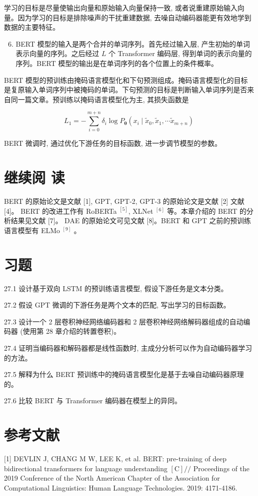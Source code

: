 \documentclass[10pt]{article}
\begin{document}
学习的目标是尽量使输出向量和原始输入向量保持一致, 或者说重建原始输入向量。因为学习的目标是排除噪声的干扰重建数据, 去噪自动编码器能更有效地学到数据的主要特征。

\begin{enumerate}
  \setcounter{enumi}{5}
  \item BERT 模型的输入是两个合并的单词序列。首先经过输入层, 产生初始的单词表示向量的序列。之后经过 $L$ 个 Transformer 编码层, 得到单词的表示向量的序列。BERT 模型的输出是在单词序列的各个位置上的条件概率。
\end{enumerate}

BERT 模型的预训练由掩码语言模型化和下句预测组成。掩码语言模型化的目标是复原输入单词序列中被掩码的单词。下句预测的目标是判断输入单词序列是否来自同一篇文章。预训练以掩码语言模型化为主, 其损失函数是

$$
L_{1}=-\sum_{i=0}^{m+n} \delta_{i} \log P_{\boldsymbol{\theta}}\left(x_{i} \mid \tilde{x}_{0}, \tilde{x}_{1}, \cdots \tilde{x}_{m+n}\right)
$$

BERT 微调时, 通过优化下游任务的目标函数, 进一步调节模型的参数。

\section*{继续阅 读}
BERT 的原始论文是文献 [1], GPT, GPT-2, GPT-3 的原始论文是文献 [2] 文献 [4]。 BERT 的改进工作有 RoBERTa ${ }^{[5]}$, XLNet ${ }^{[6]}$ 等。本章介绍的 BERT 的分析结果见文献 [7]。 DAE 的原始论文可见文献 [8]。BERT 和 GPT 之前的预训练语言模型有 ELMo ${ }^{[9]}$ 。

\section*{习题}
27.1 设计基于双向 LSTM 的预训练语言模型, 假设下游任务是文本分类。

27.2 假设 GPT 微调的下游任务是两个文本的匹配, 写出学习的目标函数。

27.3 设计一个 2 层卷积神经网络编码器和 2 层卷积神经网络解码器组成的自动编码器 (使用第 28 章介绍的转置卷积)。

27.4 证明当编码器和解码器都是线性函数时, 主成分分析可以作为自动编码器学习的方法。

27.5 解释为什么 BERT 预训练中的掩码语言模型化是基于去噪自动编码器原理的。

27.6 比较 BERT 与 Transformer 编码器在模型上的异同。

\section*{参考文献}
[1] DEVLIN J, CHANG M W, LEE K, et al. BERT: pre-training of deep bidirectional transformers for language understanding $[\mathrm{C}] / /$ Proceedings of the 2019 Conference of the North American Chapter of the Association for Computational Linguistics: Human Language Technologies. 2019: 4171-4186.
\end{document}

